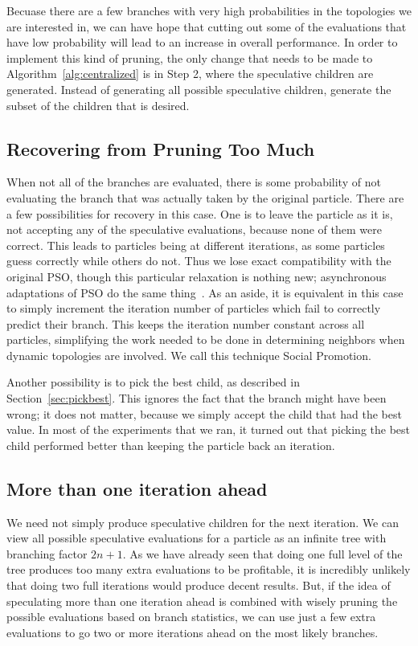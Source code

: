 \documentclass[smallcondensed]{svjour3}
\renewcommand{\sec}[1]{Section~\ref{sec:#1}}
\newcommand{\alg}[1]{Algorithm~\ref{alg:#1}}
\begin{document}
Becuase there are a few branches with very high probabilities in the topologies
we are interested in, we can have hope that cutting out some of the evaluations
that have low probability will lead to an increase in overall performance.  In
order to implement this kind of pruning, the only change that needs to be made
to \alg{centralized} is in Step 2, where the speculative children are
generated.  Instead of generating all possible speculative children, generate
the subset of the children that is desired.

\subsection{Recovering from Pruning Too Much}
\label{sec:wrong}

When not all of the branches are evaluated, there is some probability of not
evaluating the branch that was actually taken by the original particle.  There
are a few possibilities for recovery in this case.  One is to leave the
particle as it is, not accepting any of the speculative evaluations, because
none of them were correct.  This leads to particles being at different
iterations, as some particles guess correctly while others do not.  Thus we
lose exact compatibility with the original PSO, though this particular
relaxation is nothing new; asynchronous adaptations of PSO do the same
thing~\citep{koh-2006-parallel-asynchronous-pso}.  As an aside, it is equivalent
in this case to simply increment the iteration number of particles which fail
to correctly predict their branch.  This keeps the iteration number constant
across all particles, simplifying the work needed to be done in determining
neighbors when dynamic topologies are involved.  We call this technique Social
Promotion.

Another possibility is to pick the best child, as described in \sec{pickbest}.
This ignores the fact that the branch might have been wrong; it does not
matter, because we simply accept the child that had the best value.  In most of
the experiments that we ran, it turned out that picking the best child
performed better than keeping the particle back an iteration.

\subsection{More than one iteration ahead}
\label{sec:manyiters}

We need not simply produce speculative children for the next iteration.  We can
view all possible speculative evaluations for a particle as an infinite tree
with branching factor $2n+1$.  As we have already seen that doing one full
level of the tree produces too many extra evaluations to be profitable, it is
incredibly unlikely that doing two full iterations would produce decent
results.  But, if the idea of speculating more than one iteration ahead is
combined with wisely pruning the possible evaluations based on branch
statistics, we can use just a few extra evaluations to go two or more
iterations ahead on the most likely branches.
\end{document}
